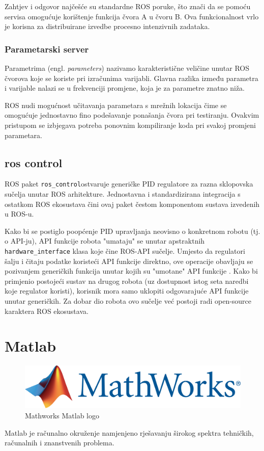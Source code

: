 \documentclass[times, utf8, diplomski, numeric]{fer}
\begin{document}
Zahtjev i odgovor najčešće su standardne ROS poruke, što znači da se pomoću servisa omogućuje korištenje funkcija čvora A u čvoru B. 
Ova funkcionalnost vrlo je korisna za distribuirane izvedbe procesno intenzivnih zadataka. 

\subsubsection{Parametarski server}
Parametrima (engl. \textit{parameters}) nazivamo karakteristične veličine unutar ROS čvorova koje se koriste pri izračunima varijabli. 
Glavna razlika između parametra i varijable nalazi se u frekvenciji promjene, koja je za parametre znatno niža. 

ROS nudi mogućnost učitavanja parametara s mrežnih lokacija čime se omogućuje jednostavno fino podešavanje ponašanja čvora pri testiranju.
Ovakvim pristupom se izbjegava potreba ponovnim kompiliranje koda pri svakoj promjeni parametara.

\subsection{ros control}
ROS paket \texttt{ros\_control}ostvaruje generičke PID regulatore za razna sklopovska sučelja unutar ROS arhitekture.
Jednostavna i standardizirana integracija s ostatkom ROS ekosustava čini ovaj paket čestom komponentom sustava izvedenih u ROS-u.

Kako bi se postiglo poopćenje PID upravljanja neovisno o konkretnom robotu (tj. o API-ju), API funkcije robota "umataju" se unutar apstraktnih \texttt{hardware\_interface} klasa koje čine ROS-API sučelje.
Umjesto da regulatori šalju i čitaju podatke koristeći API funkcije direktno, ove operacije obavljaju se pozivanjem generičkih funkcija unutar kojih su "umotane" API funkcije .
Kako bi primjenio postojeći sustav na drugog robota (uz dostupnost istog seta naredbi koje regulator koristi), korisnik mora samo uklopiti odgovarajuće API funkcije unutar generičkih.
Za dobar dio robota ovo sučelje već postoji radi open-source karaktera ROS ekosustava.


\section{Matlab}
\begin{figure}[h!]
\centering
\includegraphics[scale=0.3]{logo_mathworks}
\caption{Mathworks Matlab logo}
\end{figure}
Matlab je računalno okruženje namjenjeno rješavanju širokog spektra tehničkih, računalnih i znanstvenih problema.
\end{document}

